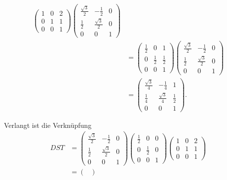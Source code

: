 \begin{loesung}
\begin{teilaufgaben}
\begin{align*}
\begin{pmatrix}
1&0&2\\
0&1&1\\
0&0&1
\end{pmatrix}
\begin{pmatrix}
\frac{\sqrt{3}}2 & - \frac12        & 0 \\
\frac12          & \frac{\sqrt{3}}2 & 0 \\
      0          &        0         & 1
\end{pmatrix}
\\
&=
\begin{pmatrix}
\frac12 &     0   & 1 \\
    0   & \frac12 & \frac12 \\
    0   &     0   & 1 
\end{pmatrix}
\begin{pmatrix}
\frac{\sqrt{3}}2 & - \frac12        & 0 \\
\frac12          & \frac{\sqrt{3}}2 & 0 \\
      0          &        0         & 1
\end{pmatrix}
\\
&=
\begin{pmatrix}
\frac{\sqrt{3}}4 & -\frac14        & 1       \\
\frac14          &\frac{\sqrt{3}}4 & \frac12 \\
0                &     0           & 1 
\end{pmatrix}.
\end{align*}
\item
Verlangt ist die Verknüpfung
\begin{align*}
DST
&=
\begin{pmatrix}
\frac{\sqrt{3}}2 & - \frac12        & 0 \\
\frac12          & \frac{\sqrt{3}}2 & 0 \\
      0          &        0         & 1
\end{pmatrix}
\begin{pmatrix}
\frac12 &     0   & 0 \\
    0   & \frac12 & 0 \\
    0   &     0   & 1 
\end{pmatrix}
\begin{pmatrix}
1&0&2\\
0&1&1\\
0&0&1
\end{pmatrix}
\\
&=
\begin{pmatrix}

\end{pmatrix}
\end{align*}
\end{teilaufgaben}
\end{loesung}
